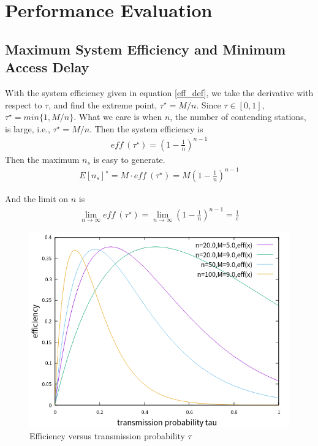 \chapter{Performance Evaluation}
\section{Maximum System Efficiency and Minimum Access Delay} 	\label{sec_max_min}
With the system efficiency given in equation \ref{eff_def}, we take the derivative with respect to $\tau$, and find the extreme point, $\tau^\star = M/n$. Since $\tau\in [0,1]$, $\tau^\star = min\lbrace 1,M/n\rbrace$. 
What we care is when $n$, the number of contending stations, is large, i.e., $\tau^\star = M/n$. 
Then the system efficiency is
\begin{align}
\textit{eff}\ (\tau^\star) = (1-\frac{1}{n})^{n-1} 
\end{align}
Then the maximum $n_s$ is easy to generate.
\begin{align}
\label{equ_max_ns}
E[n_s]^\star = M \cdot \textit{eff}\ (\tau^\star) = M(1-\frac{1}{n})^{n-1} 
\end{align}

And the limit on $n$ is
\begin{align}
\label{eff_limit}
\lim_{n\rightarrow \infty}\textit{eff}\ (\tau^\star) = \lim_{n\rightarrow \infty}(1-\frac{1}{n})^{n-1} =\frac{1}{e} 
\end{align}

\begin{figure}[!ht]
\includegraphics[scale=0.54]{./figure/eff_tau.png}
\caption{Efficiency versus transmission probability $\tau$}
\label{fig_eff_def}
\end{figure}

